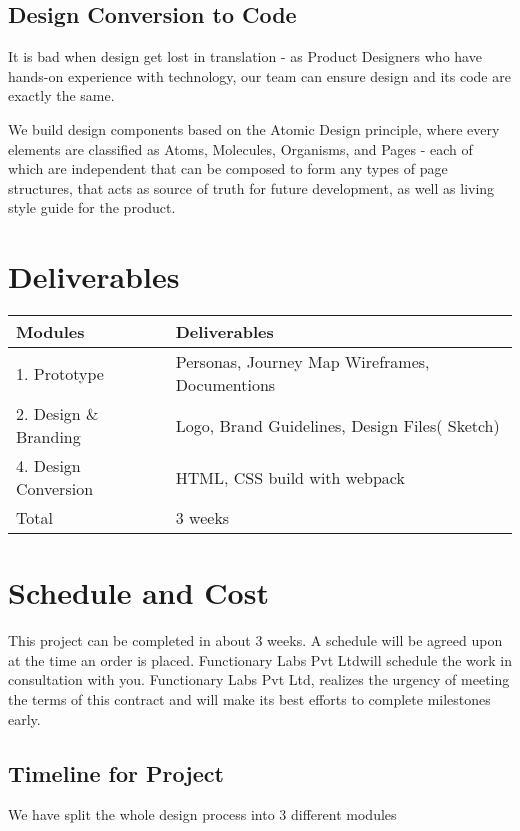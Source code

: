 \documentclass[a4paper,10pt]{article}
\newcommand{\newCommandOurCompany}{Functionary Labs Pvt Ltd}
\newcommand{\head}[1]{\textnormal{\textbf{#1}}}
\begin{document}
		\subsection{Design Conversion to Code}
		It is bad when design get lost in translation - as Product Designers who have hands-on experience with technology, our team can ensure design and its code are exactly the same.
		
		We build design components based on the Atomic Design principle, where every elements are classified as Atoms, Molecules, Organisms, and Pages - each of which are independent that can be composed to form any types of page structures, that  acts as source of truth for future development, as well as living style guide for the product.
		
		\section{Deliverables}
		
			\begin{tabular}{ll}
			\hline
			\toprule[1.5pt]
			\head{Modules} & \head{Deliverables}\\
			\hline
			1. Prototype & Personas, Journey Map Wireframes, Documentions \\
			2. Design \& Branding  & Logo, Brand Guidelines, Design Files( Sketch)\\
			4. Design Conversion  & HTML, CSS build with webpack\\
			\hline
			Total & 3 weeks \\
			\toprule[1.5pt]
		\end{tabular}
		
		\section{Schedule and Cost}
		This project can be completed in about 3 weeks. A schedule will be agreed upon at the time an order is placed. \newCommandOurCompany  will schedule the work in consultation with you. \newCommandOurCompany, realizes the urgency of meeting the terms of this contract and will make its best efforts to complete milestones early.
		
		
		\subsection{Timeline for Project }
		
		\noindent We have split the whole design process into 3 different modules\\
		
\end{document}
